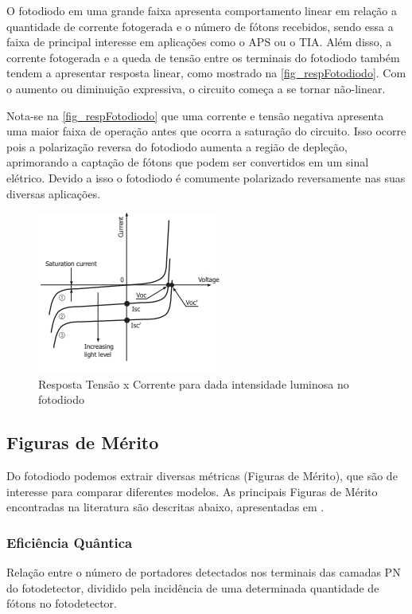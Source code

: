 O fotodiodo em uma grande faixa apresenta comportamento linear em relação a quantidade de corrente fotogerada e o número de fótons recebidos, sendo essa a faixa de principal interesse em aplicações como o APS ou o TIA. Além disso, a corrente fotogerada e a queda de tensão entre os terminais do fotodiodo também tendem a apresentar resposta linear, como mostrado na \autoref{fig_respFotodiodo}. Com o aumento ou diminuição expressiva, o circuito começa a se tornar não-linear.

Nota-se na \autoref{fig_respFotodiodo} que uma corrente e tensão negativa apresenta uma maior faixa de operação antes que ocorra a saturação do circuito. Isso ocorre pois a polarização reversa do fotodiodo aumenta a região de depleção, aprimorando a captação de fótons que podem ser convertidos em um sinal elétrico. Devido a isso o fotodiodo é comumente polarizado reversamente nas suas diversas aplicações.

\begin{figure}[!h]
	\caption{\label{fig_respFotodiodo}Resposta Tensão x Corrente para dada intensidade luminosa no fotodiodo}
	\begin{center}
	    \includegraphics[scale=0.8]{Imagens/graficoRespostaFotodiodo.png}
	\end{center}
\end{figure}

\subsection{Figuras de M\'erito}
Do fotodiodo podemos extrair diversas m\'etricas (Figuras de M\'erito), que são de interesse para comparar diferentes modelos. As principais Figuras de M\'erito encontradas na literatura são descritas abaixo, apresentadas em \cite{LidianeCampos}.

\subsubsection{Eficiência Quântica}
Relação entre o número de portadores detectados nos terminais das camadas PN do fotodetector, dividido pela incidência de uma determinada quantidade de fótons no fotodetector.

